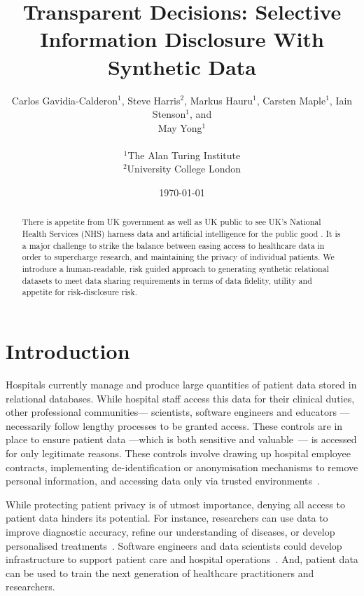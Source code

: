 \documentclass[11pt]{article}
\begin{document}
\title{Transparent Decisions: Selective Information Disclosure With Synthetic Data}
\author{
Carlos Gavidia-Calderon$^1$, Steve Harris$^2$, Markus Hauru$^1$, Carsten Maple$^1$, Iain Stenson$^1$, and \\ May Yong$^1$ \\~\\
$^1$The Alan Turing Institute \\
$^2$University College London
}
\date{\today} %
\maketitle
\begin{abstract}
There is appetite from UK government as well as UK public to see UK's National Health Services (NHS) harness data and artificial intelligence for the public good \cite{gov2022datasaves}\cite{Jones2022}. It is a major challenge to strike the balance between easing access to healthcare data in order to supercharge research, and maintaining the privacy of individual patients. We introduce a human-readable, risk guided approach to generating synthetic relational datasets to meet data sharing requirements in terms of data fidelity, utility and appetite for risk-disclosure risk.
\end{abstract}

\section{Introduction}

Hospitals currently manage and produce large quantities of
patient data stored in relational databases. While hospital staff access this data for their clinical duties, other professional communities--- scientists, software engineers and educators --- necessarily follow lengthy processes to be granted access. These controls are in place to ensure patient data ---which is both sensitive and valuable~\cite{schomerus2022}--- is accessed for only legitimate reasons.
These controls involve drawing up hospital employee contracts, implementing de-identification or anonymisation mechanisms to remove personal information, and accessing data only via trusted environments~\cite{harris2022}.

While protecting patient privacy is of utmost importance, denying all access to 
patient data hinders its potential.
For instance, researchers can use data to improve diagnostic accuracy, refine our understanding of diseases, or develop personalised treatments~\cite{tucker2020}. Software engineers and data scientists could develop infrastructure to support patient care and hospital operations~\cite{harris2022}. And, patient data can be used to train the next generation of healthcare practitioners and researchers.
\end{document}
